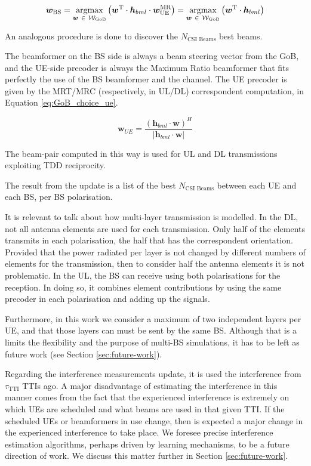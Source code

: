 \begin{equation} \label{eq:GoB_choice}
    \bm{w}_\text{BS} = \argmax_{\bm{w} \ \in \ \mathcal{W}_\text{GoB}} \left( \bm{w}^\text{T} \cdot \bm{h}_{b m l} \cdot \bm{w}_\text{UE}^\text{MR} \right) = \argmax_{\bm{w} \ \in \ \mathcal{W}_\text{GoB}} \left( \bm{w}^\text{T} \cdot \bm{h}_{b m l} \right)
\end{equation}

An analogous procedure is done to discover the $N_\text{CSI Beams}$ best beams.

The beamformer on the BS side is always a beam steering vector from the GoB, and the UE-side precoder is always the Maximum Ratio beamformer that fits perfectly the use of the BS beamformer and the channel. The UE precoder is given by the MRT/MRC (respectively, in UL/DL) correspondent computation, in Equation \ref{eq:GoB_choice_ue}.


\begin{equation} \label{eq:GoB_choice_ue}
    \bm{w}_{UE} = \frac{\left(\bm{h}_{b m l} \cdot \bm{w} \right)^H}{\left|\bm{h}_{b m l} \cdot \bm{w} \right|}
\end{equation}


The beam-pair computed in this way is used for UL and DL transmissions exploiting TDD reciprocity.

The result from the update is a list of the best $N_\text{CSI Beams}$ between each UE and each BS, per BS polarisation.


It is relevant to talk about how multi-layer transmission is modelled. In the DL, not all antenna elements are used for each transmission. Only half of the elements transmits in each polarisation, the half that has the correspondent orientation. Provided that the power radiated per layer is not changed by different numbers of elements for the transmission, then to consider half the antenna elements it is not problematic. In the UL, the BS can receive using both polarisations for the reception. In doing so, it combines element contributions by using the same precoder in each polarisation and adding up the signals. 

Furthermore, in this work we consider a maximum of two independent layers per UE, and that those layers can must be sent by the same BS. Although that is a limits the flexibility and the purpose of multi-BS simulations, it has to be left as future work (see Section \ref{sec:future-work}).




Regarding the interference measurements update, it is used the interference from $\tau_\text{TTI}$ TTIs ago. A major disadvantage of estimating the interference in this manner comes from the fact that the experienced interference is extremely on which UEs are scheduled and what beams are used in that given TTI. If the scheduled UEs or beamformers in use change, then is expected a major change in the experienced interference to take place. We foresee precise interference estimation algorithms, perhaps driven by learning mechanisms, to be a future direction of work. We discuss this matter further in Section \ref{sec:future-work}.

